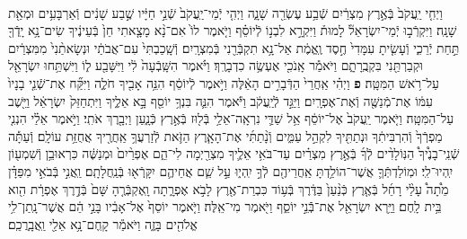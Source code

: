 \documentclass[twoside, openany, parskip=half, 11pt]{book}
\begin{document}
\begin{footnotesize}
\begin{multicols}{2}
\\
וַיְחִ֤י יַֽעֲקֹב֙ בְּֿאֶ֣רֶץ מִצְרַ֔יִם שְֿׁבַ֥ע עֶשְׂרֵ֖ה שָׁנָ֑ה וַיְהִ֤י יְֿמֵי־יַֽעֲקֹב֙ שְֿׁנֵ֣י חַיָּ֔יו שֶׁ֣בַע שָׁנִ֔ים וְֿאַרְבָּעִ֥ים וּמְאַ֖ת שָׁנָֽה׃ וַיִּקְרְֿב֣וּ יְֿמֵי־יִשְׂרָאֵל֘ לָמוּת֒ וַיִּקְרָ֣א לִבְנ֣וֹ לְֿיוֹסֵ֗ף וַיֹּ֤אמֶר לוֹ֙ אִם־נָ֨א מָצָ֤אתִי חֵן֙ בְּֿעֵינֶ֔יךָ שִׂים־נָ֥א יָֽדְֿךָ֖ תַּ֣חַת יְֿרֵכִ֑י וְֿעָשִׂ֤יתָ עִמָּדִי֙ חֶ֣סֶד וֶֽאֱמֶ֔ת אַל־נָ֥א תִקְבְּֿרֵ֖נִי בְּֿמִצְרָֽיִם׃ וְֿשָֽׁכַבְתִּי֙ עִם־אֲבֹתַ֔י וּנְשָׂאתַ֨נִי֙ מִמִּצְרַ֔יִם וּקְבַרְתַּ֖נִי בִּקְבֻֽרָתָ֑ם וַיֹּאמַ֕ר אָֽנֹכִ֖י אֶעְשֶׂ֥ה כִדְבָרֶֽךָ׃ וַיֹּ֗אמֶר הִשָּֽׁבְֿעָה֙ לִ֔י וַיִּשָּׁבַ֖ע ל֑וֹ וַיִּשְׁתַּ֥חוּ יִשְׂרָאֵ֖ל עַל־רֹ֥אשׁ הַמִּטָּֽה׃ \textbf{פ}
וַיְהִ֗י אַֽחֲרֵי֙ הַדְּֿבָרִ֣ים הָאֵ֔לֶּה וַיֹּ֣אמֶר לְֿיוֹסֵ֔ף הִנֵּ֥ה אָבִ֖יךָ חֹלֶ֑ה וַיִּקַּ֞ח אֶת־שְֿׁנֵ֤י בָנָיו֙ עִמּ֔וֹ אֶת־מְֿנַשֶּׁ֖ה וְֿאֶת־אֶפְרָֽיִם׃ וַיַּגֵּ֣ד לְֿיַֽעֲקֹ֔ב וַיֹּ֕אמֶר הִנֵּ֛ה בִּנְךָ֥ יוֹסֵ֖ף בָּ֣א אֵלֶ֑יךָ וַיִּתְחַזֵּק֙ יִשְׂרָאֵ֔ל וַיֵּ֖שֶׁב עַל־הַמִּטָּֽה׃ וַיֹּ֤אמֶר יַֽעֲקֹב֙ אֶל־יוֹסֵ֔ף אֵ֥ל שַׁדַּ֛י נִרְאָֽה־אֵלַ֥י בְּֿל֖וּז בְּֿאֶ֣רֶץ כְּֿנָ֑עַן וַיְבָ֖רֶךְ אֹתִֽי׃  וַיֹּ֣אמֶר אֵלַ֗י הִנְנִ֤י מַפְרְֿךָ֙ וְֿהִרְבִּיתִ֔ךָ וּנְתַתִּ֖יךָ לִקְהַ֣ל עַמִּ֑ים וְֿנָ֨תַתִּ֜י אֶת־הָאָ֧רֶץ הַזֹּ֛את לְֿזַרְעֲךָ֥ אַֽחֲרֶ֖יךָ אֲחֻזַּ֥ת עוֹלָֽם׃ וְֿעַתָּ֡ה שְֿׁנֵֽי־בָנֶ֩יךָ֩ הַנּֽוֹלָדִ֨ים לְֿךָ֜ בְּֿאֶ֣רֶץ מִצְרַ֗יִם עַד־בֹּאִ֥י אֵלֶ֛יךָ מִצְרַ֖יְמָה לִי־הֵ֑ם אֶפְרַ֨יִם֙ וּמְנַשֶּׁ֔ה כִּרְאוּבֵ֥ן וְֿשִׁמְע֖וֹן יִֽהְיוּ־לִֽי׃ וּמֽוֹלַדְתְּֿךָ֛ אֲשֶׁר־הוֹלַ֥דְתָּ אַֽחֲרֵיהֶ֖ם לְֿךָ֣ יִֽהְי֑וּ עַ֣ל שֵׁ֧ם אֲחֵיהֶ֛ם יִקָּֽרְֿא֖וּ בְּֿנַֽחֲלָתָֽם׃ וַֽאֲנִ֣י בְּֿבֹאִ֣י מִפַּדָּ֗ן מֵ֩תָה֩ עָלַ֨י רָחֵ֜ל בְּֿאֶ֤רֶץ כְּֿנַ֨עַן֙ בַּדֶּ֔רֶךְ בְּֿע֥וֹד כִּבְרַת־אֶ֖רֶץ לָבֹ֣א אֶפְרָ֑תָה וָֽאֶקְבְּֿרֶ֤הָ שָּׁם֙ בְּֿדֶ֣רֶךְ אֶפְרָ֔ת הִ֖וא בֵּ֥ית לָֽחֶם׃ וַיַּ֥רְא יִשְׂרָאֵ֖ל אֶת־בְּֿֿנֵ֣י יוֹסֵ֑ף וַיֹּ֖אמֶר מִי־אֵֽלֶּה׃ וַיֹּ֤אמֶר יוֹסֵף֙ אֶל־אָבִ֔יו בָּנַ֣י הֵ֔ם אֲשֶׁר־נָֽתַן־לִ֥י אֱלֹהִ֖ים בָּזֶ֑ה וַיֹּאמַ֕ר קָֽחֶם־נָ֥א אֵלַ֖י וַֽאֲבָֽרֲכֵֽם׃


\end{multicols}
\end{footnotesize}
\end{document}
